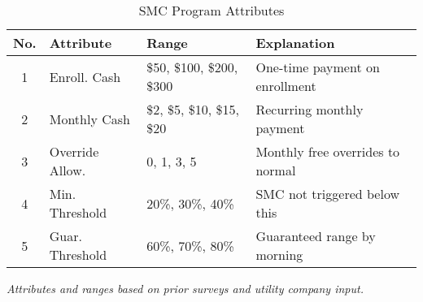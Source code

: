 \begin{table}[H]
\centering
\caption{SMC Program Attributes}
\begin{tabular}{clll}
\toprule
\textbf{No.} & \textbf{Attribute} & \textbf{Range} & \textbf{Explanation}\\
\midrule
1 & Enroll. Cash & \$50, \$100, \$200, \$300 & One-time payment on enrollment\\
2 & Monthly Cash & \$2, \$5, \$10, \$15, \$20 & Recurring monthly payment\\
3 & Override Allow. & 0, 1, 3, 5 & Monthly free overrides to normal\\
4 & Min. Threshold & 20\%, 30\%, 40\% & SMC not triggered below this\\
5 & Guar. Threshold & 60\%, 70\%, 80\% & Guaranteed range by morning\\
\bottomrule
\end{tabular}
\begin{tablenotes}
\footnotesize
\item [] \textit{Attributes and ranges based on prior surveys \cite{dean_americans_2024, wong_incentives_2023} and utility company input.}
\end{tablenotes}
\label{table_smc_attr}
\end{table}